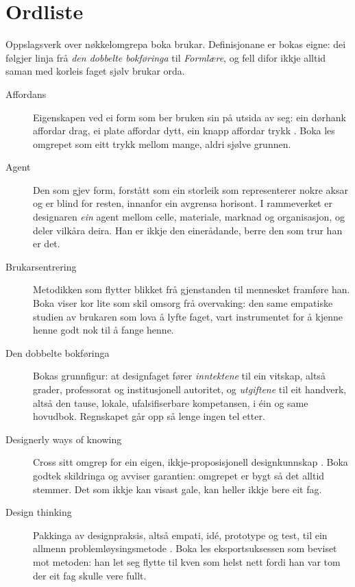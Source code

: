 \chapter*{Ordliste}

Oppslagsverk over nøkkelomgrepa boka brukar. Definisjonane er bokas eigne: dei følgjer linja frå \emph{den dobbelte bokføringa} til \emph{Formlære}, og fell difor ikkje alltid saman med korleis faget sjølv brukar orda.

\begin{description}

\item[Affordans] Eigenskapen ved ei form som ber bruken sin på utsida av seg: ein dørhank affordar drag, ei plate affordar dytt, ein knapp affordar trykk \autocite{norman2013}. Boka les omgrepet som eitt trykk mellom mange, aldri sjølve grunnen.

\item[Agent] Den som gjev form, forstått som ein storleik som representerer nokre aksar og er blind for resten, innanfor ein avgrensa horisont. I rammeverket er designaren \emph{ein} agent mellom celle, materiale, marknad og organisasjon, og deler vilkåra deira. Han er ikkje den einerådande, berre den som trur han er det.

\item[Brukarsentrering] Metodikken som flytter blikket frå gjenstanden til mennesket framføre han. Boka viser kor lite som skil omsorg frå overvaking: den same empatiske studien av brukaren som lova å lyfte faget, vart instrumentet for å kjenne henne godt nok til å fange henne.

\item[Den dobbelte bokføringa] Bokas grunnfigur: at designfaget fører \emph{inntektene} til ein vitskap, altså grader, professorat og institusjonell autoritet, og \emph{utgiftene} til eit handverk, altså den tause, lokale, ufalsifiserbare kompetansen, i éin og same hovudbok. Regnskapet går opp så lenge ingen tel etter.

\item[Designerly ways of knowing] Cross sitt omgrep for ein eigen, ikkje-proposisjonell designkunnskap \autocite{cross1982,cross2006}. Boka godtek skildringa og avviser garantien: omgrepet er bygt så det alltid stemmer. Det som ikkje kan visast gale, kan heller ikkje bere eit fag.

\item[Design thinking] Pakkinga av designpraksis, altså empati, idé, prototype og test, til ein allmenn problemløysingsmetode \autocite{brown2008,brown2009change}. Boka les eksportsuksessen som beviset mot metoden: han let seg flytte til kven som helst nett fordi han var tom der eit fag skulle vere fullt.


\end{description}
